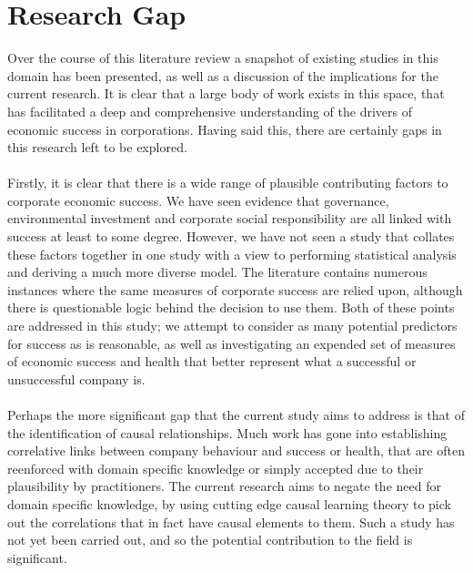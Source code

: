 {\section{Research Gap}
{Over the course of this literature review a snapshot of existing studies in this domain has been presented, as well as a discussion of the implications for the current research. It is clear that a large body of work exists in this space, that has facilitated a deep and comprehensive understanding of the drivers of economic success in corporations. Having said this, there are certainly gaps in this research left to be explored. \\\\
Firstly, it is clear that there is a wide range of plausible contributing factors to corporate economic success. We have seen evidence that governance, environmental investment and corporate social responsibility are all linked with success at least to some degree. However, we have not seen a study that collates these factors together in one study with a view to performing statistical analysis and deriving a much more diverse model. The literature contains numerous instances where the same measures of corporate success are relied upon, although there is questionable logic behind the decision to use them. Both of these points are addressed in this study; we attempt to consider as many potential predictors for success as is reasonable, as well as investigating an expended set of measures of economic success and health that better represent what a successful or unsuccessful company is.\\\\
Perhaps the more significant gap that the current study aims to address is that of the identification of causal relationships. Much work has gone into establishing correlative links between company behaviour and success or health, that are often reenforced with domain specific knowledge or simply accepted due to their plausibility by practitioners. The current research aims to negate the need for domain specific knowledge, by using cutting edge causal learning theory to pick out the correlations that in fact have causal elements to them. Such a study has not yet been carried out, and so the potential contribution to the field is significant.}


}